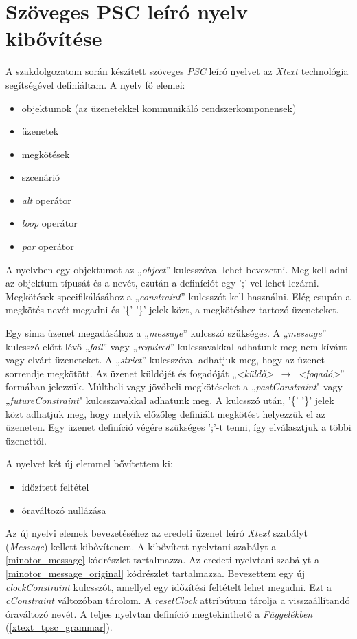 \chapter{Szöveges PSC leíró nyelv kibővítése}

A szakdolgozatom során készített szöveges \textit{PSC} leíró nyelvet \cite{Bakai} az \textit{Xtext} technológia segítségével definiáltam.
A nyelv fő elemei:
\begin{itemize}
    \item objektumok (az üzenetekkel kommunikáló rendszerkomponensek)
    \item üzenetek
    \item megkötések
    \item szcenárió
    \item \textit{alt} operátor
    \item \textit{loop} operátor
    \item \textit{par} operátor
\end{itemize}

A nyelvben egy objektumot az „\textit{object}” kulcsszóval lehet bevezetni.
Meg kell adni az objektum típusát és a nevét, ezután a definíciót egy ’;’-vel lehet lezárni.
Megkötések specifikálásához a „\textit{constraint}” kulcsszót kell használni.
Elég csupán a megkötés nevét megadni és '\{' '\}' jelek közt, a megkötéshez tartozó üzeneteket.

Egy sima üzenet megadásához a „\textit{message}” kulcsszó szükséges.
A „\textit{message}” kulcsszó előtt lévő „\textit{fail}” vagy „\textit{required}” kulcssavakkal adhatunk meg nem kívánt vagy elvárt üzeneteket.
A „\textit{strict}” kulcsszóval adhatjuk meg, hogy az üzenet sorrendje megkötött.
Az üzenet küldőjét és fogadóját „\textit{<küldő> $\,\to\,$ <fogadó>}” formában jelezzük.
Múltbeli vagy jövőbeli megkötéseket a „\textit{pastConstraint}" vagy „\textit{futureConstraint}" kulcsszavakkal adhatunk meg.
A kulcsszó után, '\{' '\}' jelek közt adhatjuk meg, hogy melyik előzőleg definiált megkötést helyezzük el az üzeneten.
Egy üzenet definíció végére szükséges ’;’-t tenni, így elválasztjuk a többi üzenettől.

A nyelvet két új elemmel bővítettem ki:
\begin{itemize}
    \item időzített feltétel
    \item óraváltozó nullázása
\end{itemize}
Az új nyelvi elemek bevezetéséhez az eredeti üzenet leíró \textit{Xtext} szabályt (\textit{Message}) kellett kibővítenem.
A kibővített nyelvtani szabályt a \ref{minotor_message} kódrészlet tartalmazza.
Az eredeti nyelvtani szabályt a \ref{minotor_message_original} kódrészlet tartalmazza.
Bevezettem egy új \textit{clockConstraint} kulcsszót, amellyel egy időzítési feltételt lehet megadni.
Ezt a \textit{cConstraint} változóban tárolom.
A \textit{resetClock} attribútum tárolja a visszaállítandó óraváltozó nevét.
A teljes nyelvtan definíció megtekinthető a \textit{Függelékben} (\ref{xtext_tpsc_grammar}).

